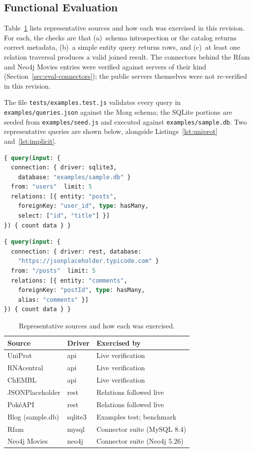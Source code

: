 \documentclass[sigconf,nonacm]{acmart}
\begin{document}
\subsection{Functional Evaluation}

Table~\ref{tab:sources} lists representative sources and how each was
exercised in this revision.  For each, the checks are that
(a)~schema introspection or the catalog returns correct metadata,
(b)~a simple entity query returns rows, and (c)~at least one relation
traversal produces a valid joined result.  The connectors behind the
Rfam and Neo4j Movies entries were verified against servers of their
kind (Section~\ref{sec:eval-connectors}); the public servers themselves
were not re-verified in this revision.

The file \texttt{tests/examples.test.js} validates every query in
\texttt{examples/queries.json} against the Mozg schema; the SQLite
portions are seeded from \texttt{examples/seed.js} and executed against
\texttt{examples/sample.db}.  Two representative queries are shown
below, alongside Listings~\ref{lst:uniprot} and~\ref{lst:implicit}.

\begin{lstlisting}[language=GraphQL,caption={SQLite: users with nested posts (hasMany)}]
{ query(input: {
  connection: { driver: sqlite3,
    database: "examples/sample.db" }
  from: "users"  limit: 5
  relations: [{ entity: "posts",
    foreignKey: "user_id", type: hasMany,
    select: ["id", "title"] }]
}) { count data } }
\end{lstlisting}

\begin{lstlisting}[language=GraphQL,caption={REST: JSONPlaceholder posts with comments}]
{ query(input: {
  connection: { driver: rest, database:
    "https://jsonplaceholder.typicode.com" }
  from: "/posts"  limit: 5
  relations: [{ entity: "comments",
    foreignKey: "postId", type: hasMany,
    alias: "comments" }]
}) { count data } }
\end{lstlisting}

\begin{table}[h]
\caption{Representative sources and how each was exercised.}
\label{tab:sources}
\small
\begin{tabularx}{\columnwidth}{llX}
\toprule
Source & Driver & Exercised by \\
\midrule
UniProt & api & Live verification \\
RNAcentral & api & Live verification \\
ChEMBL & api & Live verification \\
JSONPlaceholder & rest & Relations followed live \\
PokéAPI & rest & Relations followed live \\
Blog (sample.db) & sqlite3 & Examples test; benchmark \\
Rfam & mysql & Connector suite (MySQL 8.4) \\
Neo4j Movies & neo4j & Connector suite (Neo4j 5.26) \\
\bottomrule
\end{tabularx}
\end{table}
\end{document}
